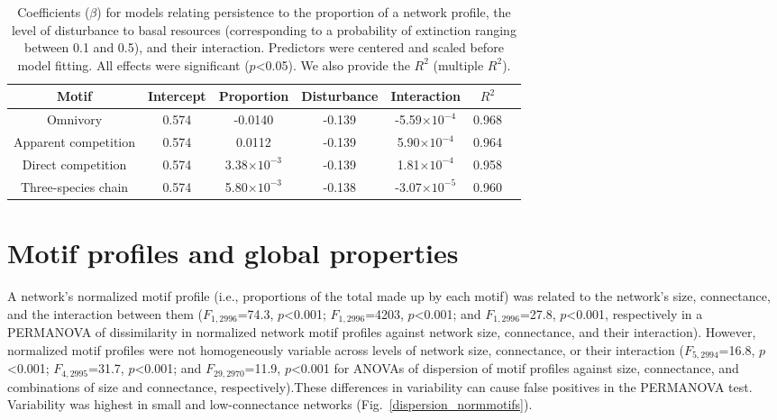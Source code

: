 \documentclass[12pt]{article}
\begin{document}
\begin{spacing}{2.0}
    \begin{table}[hb!]
        \caption{Coefficients ($\beta$) for models relating persistence to the proportion of a network profile, the level of disturbance to basal resources (corresponding to a probability of extinction ranging between 0.1 and 0.5), and their interaction. Predictors were centered and scaled before model fitting. All effects were significant ($p$\textless0.05). We also provide the $R^2$ (multiple $R^2$). }
        \label{motif_profile_tab}
        \centering
        \begin{tabular}{c|c c c c c | c}
            Motif & Intercept & Proportion & Disturbance & Interaction & $R^2$\\
            \hline
            Omnivory & 0.574 & -0.0140 & -0.139 & -5.59$\times10^{-4}$ & 0.968 \\
            Apparent competition & 0.574 & 0.0112 & -0.139 & 5.90$\times10^{-4}$ & 0.964 \\
            Direct competition & 0.574 & 3.38$\times10^{-3}$ & -0.139 & 1.81$\times10^{-4}$ & 0.958 \\
            Three-species chain & 0.574 & 5.80$\times10^{-3}$ & -0.138 & -3.07$\times10^{-5}$ & 0.960 \\ 
        \end{tabular}
    \end{table}
\clearpage


\section{Motif profiles and global properties}

    A network's normalized motif profile (i.e., proportions of the total made up by each motif) was related to the network's size, connectance, and the interaction between them ($F_{1,2996}$=74.3, $p$\textless0.001; $F_{1,2996}$=4203, $p$\textless0.001; and $F_{1,2996}$=27.8, $p$\textless0.001, respectively in a PERMANOVA of dissimilarity in normalized network motif profiles against network size, connectance, and their interaction).
    However, normalized motif profiles were not homogeneously variable across levels of network size, connectance, or their interaction  ($F_{5,2994}$=16.8, $p$\textless0.001; $F_{4,2995}$=31.7, $p$\textless0.001; and $F_{29,2970}$=11.9, $p$\textless0.001 for ANOVAs of dispersion of motif profiles against size, connectance, and combinations of size and connectance, respectively).These differences in variability can cause false positives in the PERMANOVA test. Variability was highest in small and low-connectance networks (Fig.~\ref{dispersion_normmotifs}).



\end{spacing}
\end{document}
